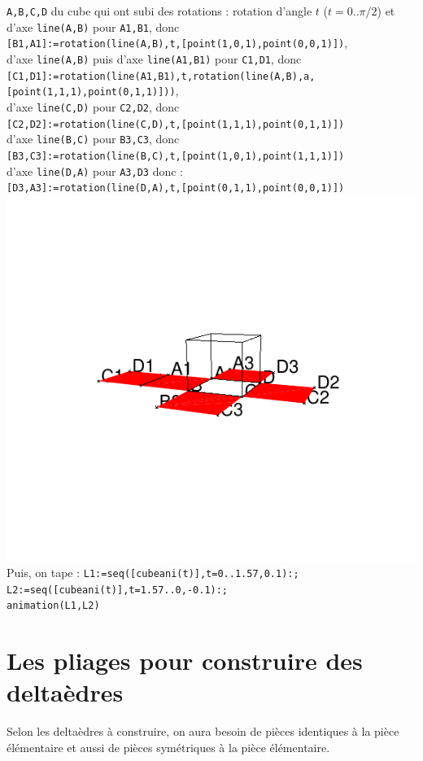 \documentclass[a4paper,11pt]{book}
\begin{document}
{\tt A,B,C,D} du cube qui ont subi des rotations : rotation d'angle $t$ 
($t=0..\pi/2$) et \\
d'axe {\tt line(A,B)} pour {\tt A1,B1}, donc \\
{\tt [B1,A1]:=rotation(line(A,B),t,[point(1,0,1),point(0,0,1)])},\\
d'axe {\tt line(A,B)} puis d'axe {\tt line(A1,B1)} pour {\tt C1,D1}, donc \\
{\tt [C1,D1]:=rotation(line(A1,B1),t,rotation(line(A,B),a,
              [point(1,1,1),point(0,1,1)]))},\\
d'axe {\tt line(C,D)} pour {\tt C2,D2}, donc\\
{\tt [C2,D2]:=rotation(line(C,D),t,[point(1,1,1),point(0,1,1)])}\\
d'axe {\tt line(B,C)} pour {\tt B3,C3}, donc\\
{\tt [B3,C3]:=rotation(line(B,C),t,[point(1,0,1),point(1,1,1)])}\\
d'axe {\tt line(D,A)} pour {\tt A3,D3} donc :\\
{\tt [D3,A3]:=rotation(line(D,A),t,[point(0,1,1),point(0,0,1)])}
\includegraphics[width=\textwidth]{cube}
Puis, on tape :
{\tt L1:=seq([cubeani(t)],t=0..1.57,0.1):;}\\
{\tt L2:=seq([cubeani(t)],t=1.57..0,-0.1):;}\\
{\tt animation(L1,L2)}
\section {Les pliages pour construire des delta\`edres}
Selon les delta\`edres \`a construire, on aura besoin de pi\`eces identiques 
\`a la pi\`ece \'el\'ementaire et aussi de pi\`eces sym\'etriques \`a la pi\`ece \'el\'ementaire.
\end{document}
